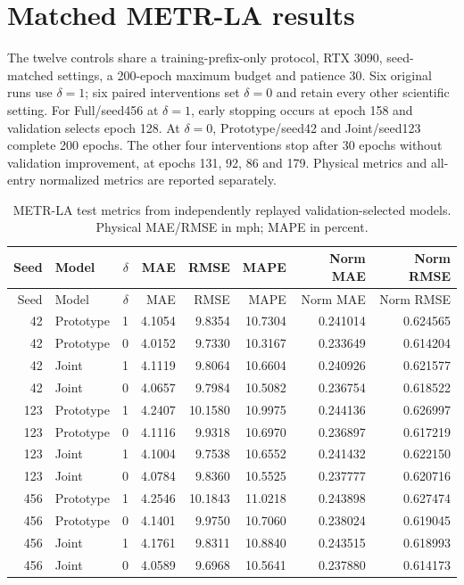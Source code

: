 \documentclass[a4paper,10pt]{article}
\begin{document}
\section{Matched METR-LA results}
The twelve controls share a training-prefix-only protocol, RTX 3090, seed-matched settings, a 200-epoch maximum budget and patience 30. Six original runs use $\delta=1$; six paired interventions set $\delta=0$ and retain every other scientific setting. For Full/seed456 at $\delta=1$, early stopping occurs at epoch 158 and validation selects epoch 128. At $\delta=0$, Prototype/seed42 and Joint/seed123 complete 200 epochs. The other four interventions stop after 30 epochs without validation improvement, at epochs 131, 92, 86 and 179. Physical metrics and all-entry normalized metrics are reported separately.

\begingroup\footnotesize\setlength{\tabcolsep}{4pt}
\begin{longtable}{rlrrrrrr}
\caption{METR-LA test metrics from independently replayed validation-selected models. Physical MAE/RMSE in mph; MAPE in percent.}\\
\toprule
Seed & Model & $\delta$ & MAE & RMSE & MAPE & Norm MAE & Norm RMSE \\
\midrule\endfirsthead
\toprule
Seed & Model & $\delta$ & MAE & RMSE & MAPE & Norm MAE & Norm RMSE \\
\midrule\endhead

42 & Prototype & 1 & 4.1054 & 9.8354 & 10.7304 & 0.241014 & 0.624565 \\

42 & Prototype & 0 & 4.0152 & 9.7330 & 10.3167 & 0.233649 & 0.614204 \\

42 & Joint & 1 & 4.1119 & 9.8064 & 10.6604 & 0.240926 & 0.621577 \\

42 & Joint & 0 & 4.0657 & 9.7984 & 10.5082 & 0.236754 & 0.618522 \\

123 & Prototype & 1 & 4.2407 & 10.1580 & 10.9975 & 0.244136 & 0.626997 \\

123 & Prototype & 0 & 4.1116 & 9.9318 & 10.6970 & 0.236897 & 0.617219 \\

123 & Joint & 1 & 4.1004 & 9.7538 & 10.6552 & 0.241432 & 0.622150 \\

123 & Joint & 0 & 4.0784 & 9.8360 & 10.5525 & 0.237777 & 0.620716 \\

456 & Prototype & 1 & 4.2546 & 10.1843 & 11.0218 & 0.243898 & 0.627474 \\

456 & Prototype & 0 & 4.1401 & 9.9750 & 10.7060 & 0.238024 & 0.619045 \\

456 & Joint & 1 & 4.1761 & 9.8311 & 10.8840 & 0.243515 & 0.618993 \\

456 & Joint & 0 & 4.0589 & 9.6968 & 10.5641 & 0.237880 & 0.614173 \\

\bottomrule
\end{longtable}\endgroup
\end{document}
